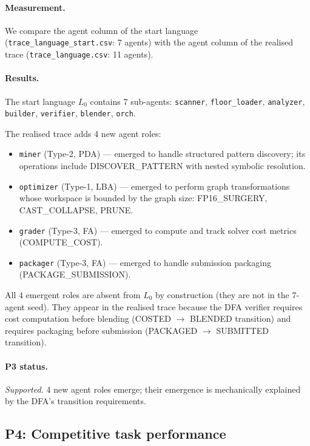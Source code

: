 \paragraph{Measurement.}
We compare the agent column of the start language
(\texttt{trace\_language\_start.csv}: 7 agents) with the agent
column of the realised trace (\texttt{trace\_language.csv}: 11 agents).

\paragraph{Results.}
The start language $L_0$ contains 7 sub-agents:
\texttt{scanner}, \texttt{floor\_loader}, \texttt{analyzer},
\texttt{builder}, \texttt{verifier}, \texttt{blender}, \texttt{orch}.

The realised trace adds 4 new agent roles:
\begin{itemize}
\item \texttt{miner} (Type-2, PDA) --- emerged to handle structured
  pattern discovery; its operations include \textsf{DISCOVER\_PATTERN}
  with nested symbolic resolution.
\item \texttt{optimizer} (Type-1, LBA) --- emerged to perform
  graph transformations whose workspace is bounded by the graph size:
  \textsf{FP16\_SURGERY}, \textsf{CAST\_COLLAPSE}, \textsf{PRUNE}.
\item \texttt{grader} (Type-3, FA) --- emerged to compute and
  track solver cost metrics (\textsf{COMPUTE\_COST}).
\item \texttt{packager} (Type-3, FA) --- emerged to handle
  submission packaging (\textsf{PACKAGE\_SUBMISSION}).
\end{itemize}

All 4 emergent roles are absent from $L_0$ by construction
(they are not in the 7-agent seed).  They appear in the realised
trace because the DFA verifier requires cost computation before
blending (\textsf{COSTED} $\to$ \textsf{BLENDED} transition) and
requires packaging before submission (\textsf{PACKAGED} $\to$
\textsf{SUBMITTED} transition).

\paragraph{P3 status.}  \emph{Supported.}
4 new agent roles emerge; their emergence is mechanically explained
by the DFA's transition requirements.

\subsection{P4: Competitive task performance}

